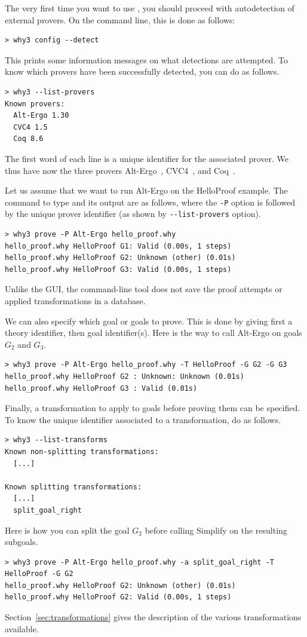 The very first time you want to use \why, you should proceed with
autodetection of external provers.
On the command line, this is done as follows:
\begin{verbatim}
> why3 config --detect
\end{verbatim}
This prints some information messages on what detections are attempted. To know which
provers have been successfully detected, you can do as follows.
\begin{verbatim}
> why3 --list-provers
Known provers:
  Alt-Ergo 1.30
  CVC4 1.5
  Coq 8.6
\end{verbatim}
The first word of each line
is a unique identifier for the associated prover. We thus have now the
three provers Alt-Ergo~\cite{ergo}, CVC4~\cite{cvc4}, and
Coq~\cite{CoqArt}.

Let us assume that we want to run Alt-Ergo on the HelloProof
example. The command to type and its output are as follows, where the
\verb|-P| option is followed by the unique prover identifier (as shown
by \verb|--list-provers| option).
\begin{verbatim}
> why3 prove -P Alt-Ergo hello_proof.why
hello_proof.why HelloProof G1: Valid (0.00s, 1 steps)
hello_proof.why HelloProof G2: Unknown (other) (0.01s)
hello_proof.why HelloProof G3: Valid (0.00s, 1 steps)
\end{verbatim}
Unlike the \why GUI, the command-line tool does not save the proof attempts
or applied transformations in a database.

We can also specify which goal or goals to prove. This is done by giving
first a theory identifier, then goal identifier(s). Here is the way to
call Alt-Ergo on goals $G_2$ and $G_3$.
\begin{verbatim}
> why3 prove -P Alt-Ergo hello_proof.why -T HelloProof -G G2 -G G3
hello_proof.why HelloProof G2 : Unknown: Unknown (0.01s)
hello_proof.why HelloProof G3 : Valid (0.01s)
\end{verbatim}

Finally, a transformation to apply to goals before proving them can be
specified. To know the unique identifier associated to
a transformation, do as follows.
\begin{verbatim}
> why3 --list-transforms
Known non-splitting transformations:
  [...]

Known splitting transformations:
  [...]
  split_goal_right
\end{verbatim}
Here is how you can split the goal $G_2$ before calling
Simplify on the resulting subgoals.
\begin{verbatim}
> why3 prove -P Alt-Ergo hello_proof.why -a split_goal_right -T HelloProof -G G2
hello_proof.why HelloProof G2: Unknown (other) (0.01s)
hello_proof.why HelloProof G2: Valid (0.00s, 1 steps)
\end{verbatim}
Section~\ref{sec:transformations} gives the description of the various
transformations available.


